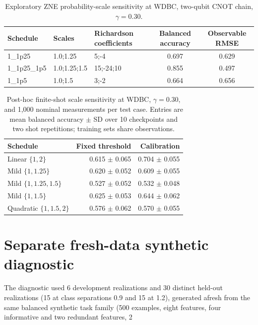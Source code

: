 \documentclass[10pt]{article}
\begin{document}
\begin{table}[H]\centering\scriptsize
\caption{Exploratory ZNE probability-scale sensitivity at WDBC, two-qubit CNOT chain, $\gamma=0.30$.}
\label{tab:scales}
\begin{tabular}{@{}l l l c c@{}}\toprule
Schedule & Scales & Richardson coefficients & Balanced accuracy & Observable RMSE \\
\midrule
1\_1p25 & 1.0;1.25 & 5;-4 & 0.697 & 0.629 \\
1\_1p25\_1p5 & 1.0;1.25;1.5 & 15;-24;10 & 0.855 & 0.497 \\
1\_1p5 & 1.0;1.5 & 3;-2 & 0.664 & 0.656 \\
\bottomrule\end{tabular}\end{table}

\begin{table}[H]\centering\small
\caption{Post-hoc finite-shot scale sensitivity at WDBC, $\gamma=0.30$, and 1,000 nominal measurements per test case. Entries are mean balanced accuracy $\pm$ SD over 10 checkpoints and two shot repetitions; training sets share observations.}
\label{tab:finite-scales}
\begin{tabular}{@{}l r r@{}}\toprule
Schedule & Fixed threshold & Calibration \\
\midrule
Linear $\{1,2\}$ & 0.615 $\pm$ 0.065 & 0.704 $\pm$ 0.055 \\
Mild $\{1,1.25\}$ & 0.620 $\pm$ 0.052 & 0.609 $\pm$ 0.055 \\
Mild $\{1,1.25,1.5\}$ & 0.527 $\pm$ 0.052 & 0.532 $\pm$ 0.048 \\
Mild $\{1,1.5\}$ & 0.625 $\pm$ 0.053 & 0.644 $\pm$ 0.062 \\
Quadratic $\{1,1.5,2\}$ & 0.576 $\pm$ 0.062 & 0.570 $\pm$ 0.055 \\
\bottomrule\end{tabular}\end{table}

\clearpage
\section*{Separate fresh-data synthetic diagnostic}

The diagnostic used 6 development realizations and 30 distinct held-out realizations (15 at class separations 0.9 and 15 at 1.2), generated afresh from the same balanced synthetic task family (500 examples, eight features, four informative and two redundant features, 2%
\end{document}
